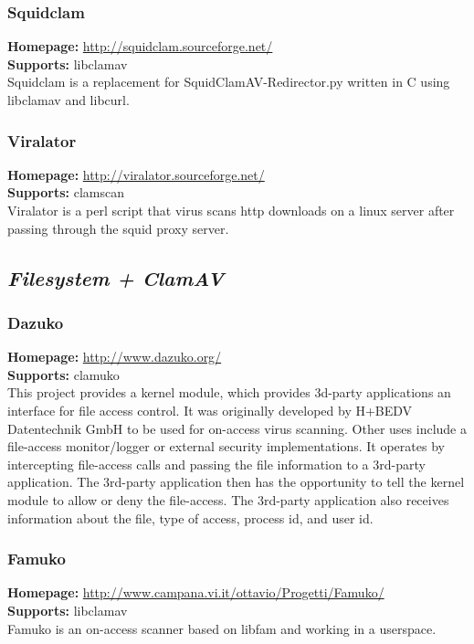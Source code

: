 \documentclass[a4paper,titlepage,12pt]{article}
\begin{document}
    \subsubsection{Squidclam}
    \textbf{Homepage:} \url{http://squidclam.sourceforge.net/}\\
    \textbf{Supports:} libclamav\\[4pt]
    Squidclam is a replacement for SquidClamAV-Redirector.py written in C
    using libclamav and libcurl.

    \subsubsection{Viralator}
    \textbf{Homepage:} \url{http://viralator.sourceforge.net/}\\
    \textbf{Supports:} clamscan\\[4pt]
    Viralator is a perl script that virus scans http downloads on a linux
    server after passing through the squid proxy server.

    \subsection{\emph{Filesystem + ClamAV}}

    \subsubsection{Dazuko}
    \textbf{Homepage:} \url{http://www.dazuko.org/}\\
    \textbf{Supports:} clamuko\\[4pt]
    This project provides a kernel module, which provides 3d-party applications
    an interface for file access control. It was originally developed by H+BEDV
    Datentechnik GmbH to be used for on-access virus scanning. Other uses
    include a file-access monitor/logger or external security implementations.
    It operates by intercepting file-access calls and passing the file
    information to a 3rd-party application. The 3rd-party application then has
    the opportunity to tell the kernel module to allow or deny the file-access.
    The 3rd-party application also receives information about the file, type
    of access, process id, and user id.

    \subsubsection{Famuko}
    \textbf{Homepage:} \url{http://www.campana.vi.it/ottavio/Progetti/Famuko/}\\
    \textbf{Supports:} libclamav\\[4pt]
    Famuko is an on-access scanner based on libfam and working in a userspace.
\end{document}
